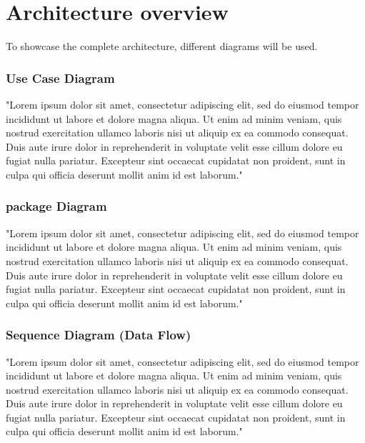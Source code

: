  
\section{Architecture overview}

To showcase the complete architecture, different diagrams will be used.  


\subsubsection{Use Case Diagram}

"Lorem ipsum dolor sit amet, consectetur adipiscing elit, sed do eiusmod tempor incididunt ut labore et dolore magna aliqua. Ut enim ad minim veniam, quis nostrud exercitation ullamco laboris nisi ut aliquip ex ea commodo consequat. Duis aute irure dolor in reprehenderit in voluptate velit esse cillum dolore eu fugiat nulla pariatur. Excepteur sint occaecat cupidatat non proident, sunt in culpa qui officia deserunt mollit anim id est laborum."

\subsubsection{package Diagram}

"Lorem ipsum dolor sit amet, consectetur adipiscing elit, sed do eiusmod tempor incididunt ut labore et dolore magna aliqua. Ut enim ad minim veniam, quis nostrud exercitation ullamco laboris nisi ut aliquip ex ea commodo consequat. Duis aute irure dolor in reprehenderit in voluptate velit esse cillum dolore eu fugiat nulla pariatur. Excepteur sint occaecat cupidatat non proident, sunt in culpa qui officia deserunt mollit anim id est laborum."


\subsubsection{Sequence Diagram (Data Flow)}
"Lorem ipsum dolor sit amet, consectetur adipiscing elit, sed do eiusmod tempor incididunt ut labore et dolore magna aliqua. Ut enim ad minim veniam, quis nostrud exercitation ullamco laboris nisi ut aliquip ex ea commodo consequat. Duis aute irure dolor in reprehenderit in voluptate velit esse cillum dolore eu fugiat nulla pariatur. Excepteur sint occaecat cupidatat non proident, sunt in culpa qui officia deserunt mollit anim id est laborum."


